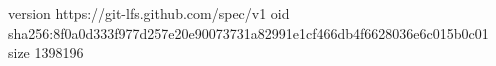 version https://git-lfs.github.com/spec/v1
oid sha256:8f0a0d333f977d257e20e90073731a82991e1cf466db4f6628036e6c015b0c01
size 1398196
